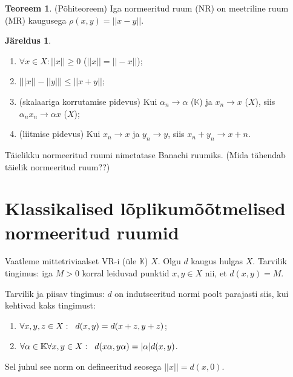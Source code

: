 \documentclass{article}[12pt]
\newcommand{\h}{\hspace{0.2cm}}
\newcommand{\K}{\mathbb{K}}
\newcommand{\norm}[1]{||#1||}
\theoremstyle{definition}
\theoremstyle{definition}
\newtheorem{theorem}{Teoreem}[section]
\newtheorem{jareldus}{Järeldus}[section]
\begin{document}
\begin{theorem}
	(Põhiteoreem) Iga normeeritud ruum (NR) on meetriline ruum (MR) kaugusega $\rho(x,y) = ||x-y||$.
\end{theorem}

\begin{jareldus}
	\begin{enumerate}
		\item $\forall x\in X: \norm{x} \geq 0$ ($\norm{x} = \norm{-x}$);
		\item $\bigg\lvert \norm{x} - \norm{y} \bigg\rvert \leq \norm{x+y}$;
		\item (skalaariga korrutamise pidevus) Kui $\alpha_n\rightarrow \alpha$ ($\K$) ja $x_n\rightarrow x$ ($X$), siis $\alpha_n x_n\rightarrow \alpha x$ ($X$);
		\item (liitmise pidevus) Kui $x_n\rightarrow x$ ja $y_n\rightarrow y$, siis $x_n+y_n \rightarrow x+n$.
	\end{enumerate}
\end{jareldus}

Täielikku normeeritud ruumi nimetatase Banachi ruumiks. (Mida tähendab täielik normeeritud ruum??)

\section{Klassikalised lõplikumõõtmelised normeeritud ruumid}

Vaatleme mittetriviaalset VR-i (üle $\K$) $X$. Olgu $d$ kaugus hulgas $X$.
Tarvilik tingimus: iga $M>0$ korral leiduvad punktid $x,y\in X$ nii, et $d(x,y) = M$.

Tarvilik ja piisav tingimus: $d$ on indutseeritud normi poolt parajasti siis, kui kehtivad kaks tingimust:
\begin{enumerate}
	\item $\forall x,y,z\in X :\h d(x,y) = d(x+z,y+z)$;
	\item $\forall \alpha\in \K \forall x,y\in X: \h d(x\alpha,y\alpha) = |\alpha|d(x,y)$.
\end{enumerate}
Sel juhul see norm on defineeritud seosega $\norm{x} = d(x,0)$.
\end{document}
